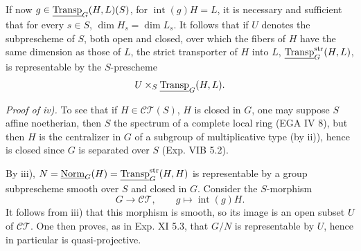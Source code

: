 If now $g\in\underline{\operatorname{Transp}}_G(H,L)(S)$, for $\operatorname{int}(g)H=L$, it is necessary and sufficient that for every $s\in S$, $\dim H_s=\dim L_s$. It follows that if $U$ denotes the subprescheme of $S$, both open and closed, over which the fibers of $H$ have the same dimension as those of $L$, the strict transporter of $H$ into $L$, $\underline{\operatorname{Transp}}_G^{\mathrm{str}}(H,L)$, is representable by the $S$-prescheme
\[
U\times_S\underline{\operatorname{Transp}}_G(H,L).
\]

\par\noindent\emph{Proof of iv).}
To see that if $H\in\mathscr{CT}(S)$, $H$ is closed in $G$, one may suppose $S$ affine noetherian, then $S$ the spectrum of a complete local ring (EGA IV 8), but then $H$ is the centralizer in $G$ of a subgroup of multiplicative type (by ii)), hence is closed since $G$ is separated over $S$ (Exp. VIB 5.2).

By iii), $N=\underline{\mathrm{Norm}}_G(H)=\underline{\operatorname{Transp}}_G^{\mathrm{str}}(H,H)$ is representable by a group subprescheme smooth over $S$ and closed in $G$. Consider the $S$-morphism
\[
G\longrightarrow\mathscr{CT},\qquad g\longmapsto\operatorname{int}(g)H.
\]
It follows from iii) that this morphism is smooth, so its image is an open subset $U$ of $\mathscr{CT}$. One then proves, as in Exp. XI 5.3, that $G/N$ is representable by $U$, hence in particular is quasi-projective.

